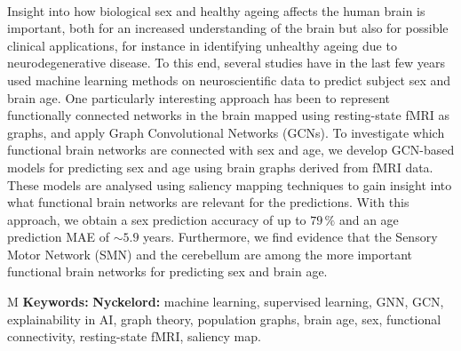 \thesisImprintTitle\\
\thesisImprintSubtitle\\
\thesisAuthor\\
\thesisDepartment\\
\thesisUniversity\setlength{\parskip}{0.5cm}

\thispagestyle{plain}			%
\section*{\abstractname}

Insight into how biological sex and healthy ageing affects the human brain is important, both for an increased understanding of the brain but also for possible clinical applications, for instance in identifying unhealthy ageing due to neurodegenerative disease. To this end, several studies have in the last few years used machine learning methods on neuroscientific data to predict subject sex and brain age. One particularly interesting approach has been to represent functionally connected networks in the brain mapped using resting-state fMRI as graphs, and apply Graph Convolutional Networks (GCNs). To investigate which functional brain networks are connected with sex and age, we develop GCN-based models for predicting sex and age using brain graphs derived from fMRI data. These models are analysed using saliency mapping techniques to gain insight into what functional brain networks are relevant for the predictions. With this approach, we obtain a sex prediction accuracy of up to $79\,\%$ and an age prediction MAE of $\sim5.9$ years. Furthermore, we find evidence that the Sensory Motor Network (SMN) and the cerebellum are among the more important functional brain networks for predicting sex and brain age.


\vfill
\if\thesisType M
    \textbf{Keywords:}
\else
    \textbf{Nyckelord:}
\fi
machine learning, supervised learning, GNN, GCN, explainability in AI, graph theory, population graphs, brain age, sex, functional connectivity, resting-state fMRI, saliency map.
\if{}
\newpage				%
\thispagestyle{empty}
\mbox{}
\fi
